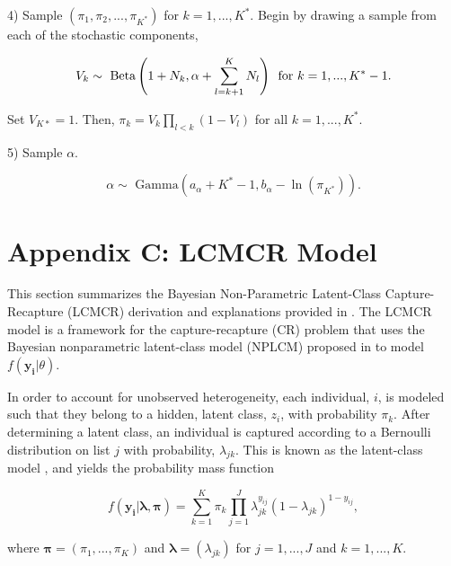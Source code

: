 \documentclass[
  12pt,
]{article}
\begin{document}
\begin{list}{}{}
\item[4)] Sample $(\pi_1,\pi_2,...,\pi_{K^*})$ for $k=1,...,K^*$.  Begin by drawing a sample from each of the stochastic components,

\begin{equation}
 V_k \sim \text{ Beta}\left(1+N_k, \alpha+\sum_{l=k+1}^K N_l\right) \hspace{5px} \text{for } k=1,...,K^*-1.
\end{equation}

Set $V_{K*}=1$.  Then, $\pi_k = V_k\prod_{l<k}(1-V_l)$ for all $k=1,...,K^*$.

\item[5)] Sample $\alpha$.

\begin{equation}
  \alpha \sim \text{ Gamma}\left(a_\alpha + K^* -1, b_\alpha - \ln(\pi_{K^*}) \right).
\end{equation}

\end{list}

\section{Appendix C: LCMCR Model}
\label{LCMCRmodel}

This section summarizes the Bayesian Non-Parametric Latent-Class
Capture-Recapture (LCMCR) derivation and explanations provided in
\cite{manriquevallier_bayesian_2016}. The LCMCR model is a framework for
the capture-recapture (CR) problem that uses the Bayesian nonparametric
latent-class model (NPLCM) proposed in \cite{dunson_nonparametric_2009}
to model \(f(\boldsymbol{y_i}|\theta)\).

In order to account for unobserved heterogeneity, each individual,
\(i\), is modeled such that they belong to a hidden, latent class,
\(z_i\), with probability \(\pi_k\). After determining a latent class,
an individual is captured according to a Bernoulli distribution on list
\(j\) with probability, \(\lambda_{jk}\). This is known as the
latent-class model \citep{goodman_exploratory_1974}, and yields the
probability mass function

\begin{equation}
\label{eqn:bernmix}
f(\boldsymbol{y_i}|\boldsymbol{\lambda,\pi}) = \sum_{k=1}^K \pi_k \prod_{j=1}^J \lambda_{jk}^{y_{ij}}(1-\lambda_{jk})^{1-y_{ij}},
\end{equation}

where \(\boldsymbol{\pi}=(\pi_1,...,\pi_K)\) and
\(\boldsymbol{\lambda} = (\lambda_{jk})\) for \(j=1,...,J\) and
\(k=1,...,K\).
\end{document}
